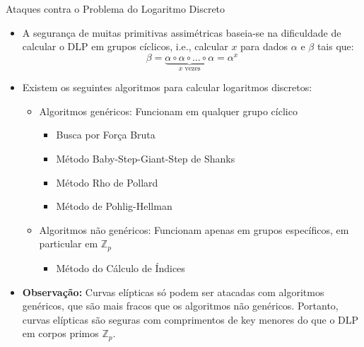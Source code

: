 \documentclass{beamer}
\begin{document}
\begin{frame}{Ataques contra o Problema do Logaritmo Discreto}
    \small %
    \begin{itemize}
        \item A segurança de muitas primitivas assimétricas baseia-se na dificuldade de calcular o DLP em grupos cíclicos, i.e., calcular $x$ para dados $\alpha$ e $\beta$ tais que:
        \[
            \beta = \underbrace{\alpha \circ \alpha \circ \ldots \circ \alpha}_{x \text{ vezes}} = \alpha^x
        \]
        \item Existem os seguintes algoritmos para calcular logaritmos discretos:
        \begin{itemize}
            \item Algoritmos genéricos: Funcionam em qualquer grupo cíclico
            \begin{itemize}
                \item Busca por Força Bruta
                \item Método Baby-Step-Giant-Step de Shanks
                \item Método Rho de Pollard
                \item Método de Pohlig-Hellman
            \end{itemize}
            \item Algoritmos não genéricos: Funcionam apenas em grupos específicos, em particular em $\mathbb{Z}_p$
            \begin{itemize}
                \item Método do Cálculo de Índices
            \end{itemize}
        \end{itemize}
        \item \textbf{Observação:} Curvas elípticas só podem ser atacadas com algoritmos genéricos, que são mais fracos que os algoritmos não genéricos. Portanto, curvas elípticas são seguras com comprimentos de key menores do que o DLP em corpos primos $\mathbb{Z}_p$.
    \end{itemize}
\end{frame}
\end{document}
